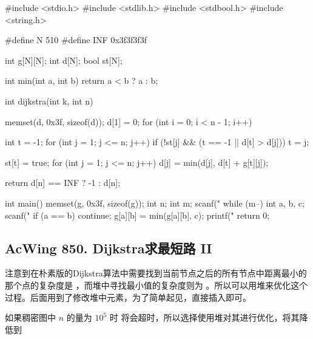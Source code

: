 \begin{mycpptwocol}[朴素 Dijkstra 算法]
    #include <stdio.h>
    #include <stdlib.h>
    #include <stdbool.h>
    #include <string.h>

    #define N 510
    #define INF 0x3f3f3f3f

    int g[N][N];
    int d[N];
    bool st[N];

    int min(int a, int b) {
        return a < b ? a : b;
    }

    int dijkstra(int k, int n) {
        memset(d, 0x3f, sizeof(d));
        d[1] = 0;
        for (int i = 0; i < n - 1; i++) {
            int t = -1;
            for (int j = 1; j <= n; j++) {
                if (!st[j] && (t == -1 || d[t] > d[j])) {
                    t = j;
                }
            }

            st[t] = true;
            for (int j = 1; j <= n; j++) {
                d[j] = min(d[j], d[t] + g[t][j]);
            }
        }

        return d[n] == INF ? -1 : d[n];
    }

    int main() {
        memset(g, 0x3f, sizeof(g));
        int n;
        int m;
        scanf("%
        while (m--) {
            int a, b, c;
            scanf("%
            if (a == b) {
                continue;
            }
            g[a][b] = min(g[a][b], c);
        }
        printf("%
        return 0;
    }
\end{mycpptwocol}

\subsection{AcWing 850. Dijkstra求最短路 II}

注意到在朴素版的Dijkstra算法中需要找到当前节点之后的所有节点中距离最小的那个点的复杂度是 ，而堆中寻找最小值的复杂度则为 。所以可以用堆来优化这个过程。后面用到了修改堆中元素，为了简单起见，直接插入即可。

如果稠密图中 $n$ 的量为 $10^5$ 时  将会超时，所以选择使用堆对其进行优化，将其降低到 


